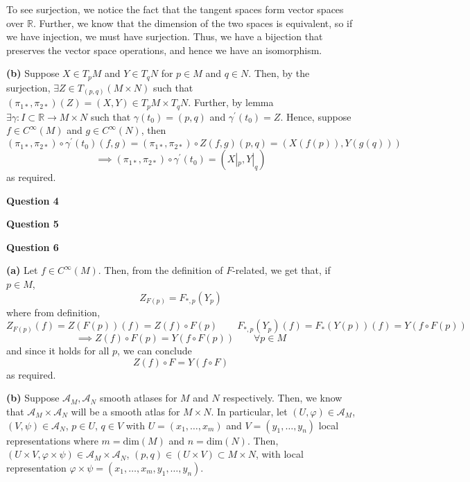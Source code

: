 \documentclass[10pt]{article}
\newcommand{\R}{\mathbb{R}}
\begin{document}
To see surjection, we notice the fact that the tangent spaces form vector spaces over $\R$. Further, we know that the dimension of the two spaces is equivalent, so if we have injection, we must have surjection. Thus, we have a bijection that preserves the vector space operations, and hence we have an isomorphism.

\textbf{(b)} Suppose $X\in T_{p}M$ and $Y\in T_{q}N$ for $p\in M$ and $q\in N$. Then, by the surjection, $\exists Z\in T_{(p,q)}(M\times N)$ such that $(\pi_{1*},\pi_{2*})(Z) = (X,Y)\in T_{p}M\times T_{q}N$. Further, by lemma $\exists \gamma: I\subset \R \to M\times N$ such that $\gamma(t_{0}) = (p,q)$ and $\gamma^{\prime}(t_{0}) = Z$. Hence, suppose $f \in C^{\infty}(M)$ and $g\in C^{\infty}(N)$, then
\[(\pi_{1*},\pi_{2*})\circ \gamma^{\prime}(t_{0})(f,g) = (\pi_{1*},\pi_{2*})\circ Z(f,g)(p,q) = (X(f(p)),Y(g(q))) \]
\[ \implies (\pi_{1*},\pi_{2*})\circ \gamma^{\prime}(t_{0}) = (X|_{p},Y|_{q}) \]
as required.

\newpage
\textbf{Question 4}

\newpage
\textbf{Question 5}

\newpage
\textbf{Question 6}

\textbf{(a)} Let $f\in C^{\infty}(M)$. Then, from the definition of $F$-related, we get that, if $p\in M$,
\[ Z_{F(p)} = F_{*,p}(Y_{p})\]
where from definition,
\[ Z_{F(p)}(f) = Z(F(p))(f) = Z(f)\circ F(p) \hspace{2em} F_{*,p}(Y_{p})(f) = F_{*}(Y(p))(f) = Y(f\circ F(p))\]
\[\implies Z(f)\circ F(p) = Y(f\circ F(p)) \hspace{2em} \forall p\in M\]
and since it holds for all $p$, we can conclude
\[ Z(f)\circ F = Y(f\circ F)\]
as required.

\textbf{(b)} Suppose $\mathcal{A}_{M}, \mathcal{A}_{N}$ smooth atlases for $M$ and $N$ respectively. Then, we know that $\mathcal{A}_{M}\times \mathcal{A}_{N}$ will be a smooth atlas for $M\times N$. In particular, let $(U,\varphi)\in \mathcal{A}_{M}$, $(V,\psi)\in \mathcal{A}_{N}$, $p\in U$, $q\in V$ with $U = (x_{1},\dots,x_{m})$ and $V = (y_{1},\dots,y_{n})$ local representations where $m = \text{dim}(M)$ and $n = \text{dim}(N)$. Then, $(U\times V,\varphi\times\psi)\in \mathcal{A}_{M}\times\mathcal{A}_{N}$, $(p,q)\in (U\times V)\subset M\times N$, with local representation $\varphi\times \psi = (x_{1},\dots,x_{m},y_{1},\dots,y_{n})$.
\end{document}
